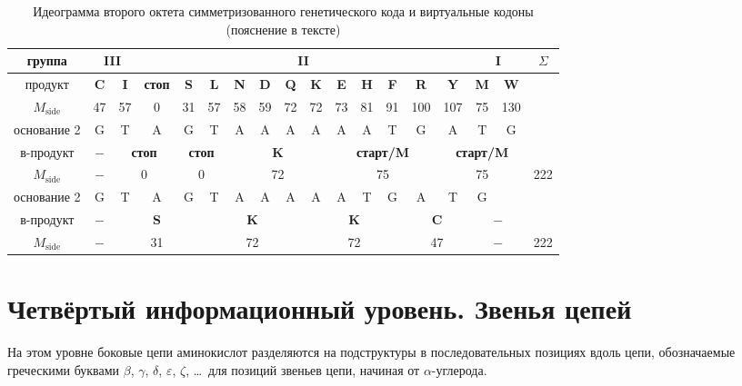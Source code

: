 \documentclass[12pt]{article}
\begin{document}
\begin{table}[htbp]
\centering
\caption{Идеограмма второго октета симметризованного генетического кода и виртуальные кодоны (пояснение в тексте)}
\label{tab:virtual_codons}
\footnotesize
\begin{tabular}{|c|c|c|c|c|c|c|c|c|c|c|c|c|c|c|c|c|c|}
\hline
группа & \multicolumn{2}{c|}{\textbf{III}} & \multicolumn{12}{c|}{\textbf{II}} & \multicolumn{2}{c|}{\textbf{I}} & $\Sigma$ \\
\hline
продукт & \textbf{C} & \textbf{I} & \textbf{стоп} & \textbf{S} & \textbf{L} & \textbf{N} & \textbf{D} & \textbf{Q} & \textbf{K} & \textbf{E} & \textbf{H} & \textbf{F} & \textbf{R} & \textbf{Y} & \textbf{M} & \textbf{W} & \\
$M_{\text{side}}$ & 47 & 57 & 0 & 31 & 57 & 58 & 59 & 72 & 72 & 73 & 81 & 91 & 100 & 107 & 75 & 130 & \\
\hline
основание 2 & G & T & A & G & T & A & A & A & A & A & A & T & G & A & T & G & \\
\hline
в-продукт & $-$ & \multicolumn{2}{c|}{\textbf{стоп}} & \multicolumn{2}{c|}{\textbf{стоп}} & \multicolumn{4}{c|}{\textbf{K}} & \multicolumn{4}{c|}{\textbf{старт/M}} & \multicolumn{3}{c|}{\textbf{старт/M}} & \\
$M_{\text{side}}$ & $-$ & \multicolumn{2}{c|}{0} & \multicolumn{2}{c|}{0} & \multicolumn{4}{c|}{72} & \multicolumn{4}{c|}{75} & \multicolumn{3}{c|}{75} & 222 \\
\hline
основание 2 & G & T & A & G & T & A & A & A & A & A & T & G & A & T & G & & \\
в-продукт & $-$ & \multicolumn{3}{c|}{\textbf{S}} & \multicolumn{4}{c|}{\textbf{K}} & \multicolumn{4}{c|}{\textbf{K}} & \multicolumn{2}{c|}{\textbf{C}} & \multicolumn{2}{c|}{$-$} & \\
$M_{\text{side}}$ & $-$ & \multicolumn{3}{c|}{31} & \multicolumn{4}{c|}{72} & \multicolumn{4}{c|}{72} & \multicolumn{2}{c|}{47} & \multicolumn{2}{c|}{$-$} & 222 \\
\hline
\end{tabular}
\end{table}


\section{Четвёртый информационный уровень. Звенья цепей}

На этом уровне боковые цепи аминокислот разделяются на подструктуры в последовательных позициях вдоль цепи, обозначаемые греческими буквами $\beta$, $\gamma$, $\delta$, $\varepsilon$, $\zeta$, \ldots\ для позиций звеньев цепи, начиная от $\alpha$-углерода.
\end{document}
